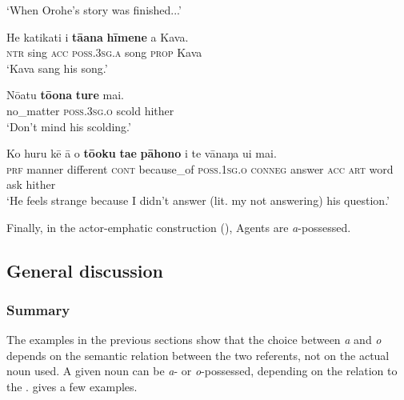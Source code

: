 \glt 
‘When Orohe’s story was finished...’ \textstyleExampleref{[R334.249]} 
\z

\ea\label{ex:6.112}
\gll He katikati i \textbf{tā{\ꞌ}ana} \textbf{hīmene} a Kava. \\
\textsc{ntr} sing \textsc{acc} \textsc{poss.3sg.a} song \textsc{prop} Kava \\

\glt 
‘Kava sang his song.’ \textstyleExampleref{[R229.158]} 
\z

\ea\label{ex:6.113}
\gll Nōatu \textbf{tō{\ꞌ}ona} \textbf{ture} mai. \\
no\_matter \textsc{poss.3sg.o} scold hither \\

\glt 
‘Don’t mind his scolding.’ \textstyleExampleref{[Egt-02.184]}
\z

\ea\label{ex:6.114}
\gll Ko huru kē {\ꞌ}ā {\ꞌ}o \textbf{tō{\ꞌ}oku} \textbf{ta{\ꞌ}e} \textbf{pāhono} i te  vānaŋa {\ꞌ}ui mai.\\
\textsc{prf} manner different \textsc{cont} because\_of \textsc{poss.1sg.o} \textsc{conneg} answer \textsc{acc} \textsc{art}  word ask hither\\

\glt 
‘He feels strange because I didn’t answer (lit. my not answering) his question.’ \textstyleExampleref{[R363.108]} 
\z

Finally, in the actor-emphatic construction (), Agents are \textit{a}{}-possessed.

\subsection{General discussion}\label{sec:6.3.4}
\subsubsection[Summary]{Summary}\label{sec:6.3.4.1}

The examples in the previous sections show that the choice between \textit{{\ꞌ}a} and \textit{o} depends on the semantic relation between the two referents, not on the actual noun used. A given noun can be \textit{a}{}- or \textit{o}{}-possessed, depending on the relation to the .  gives a few examples.

